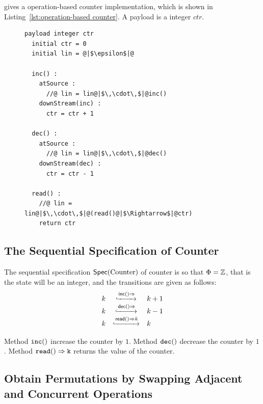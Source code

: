 \cite{ShapiroPBZ11} gives a operation-based counter implementation, which is shown in Listing~\ref{lst:operation-based counter}. A payload is a integer $ctr$.

\begin{figure}[t]
\begin{lstlisting}[frame=top,caption={Pseudo-code of operation-based counter},
captionpos=b,label={lst:operation-based counter}]
  payload integer ctr
  initial ctr = 0
  initial lin = @|$\epsilon$|@

  inc() :
    atSource :
      //@ lin = lin@|$\,\cdot\,$|@inc()
    downStream(inc) :
      ctr = ctr + 1

  dec() :
    atSource :
      //@ lin = lin@|$\,\cdot\,$|@dec()
    downStream(dec) :
      ctr = ctr - 1

  read() :
    //@ lin = lin@|$\,\cdot\,$|@(read()@|$\Rightarrow$|@ctr)
    return ctr
\end{lstlisting}
\end{figure}




\subsection{The Sequential Specification of Counter}
\label{subsec:the sequential specification of counter}

The sequential specification $\specCounter$ of counter is so that $\abstates = \mathbb{Z}$, that is the state will be an integer, and the transitions are given as follows:
\[
  \begin{array}[rcl]{rcl}
    k & \specarrow{\alabellong[\mathsf{inc}]{}{}} & k+1\\
    k & \specarrow{\alabellong[\mathsf{dec}]{}{}} & k-1\\
    k & \specarrow{\alabellong[\mathsf{read}]{}{k}} & k
  \end{array}
\]

Method $\alabelshort[{\tt inc}]{}$ increase the counter by $1$. Method $\alabelshort[{\tt dec}]{}$ decrease the counter by $1$. Method $\alabellong[{\tt read}]{}{k}{}$ returns the value of the counter.





\subsection{Obtain Permutations by Swapping Adjacent and Concurrent Operations}
\label{subsec:obtain permutations by swapping adjacent and concurrent operations}

